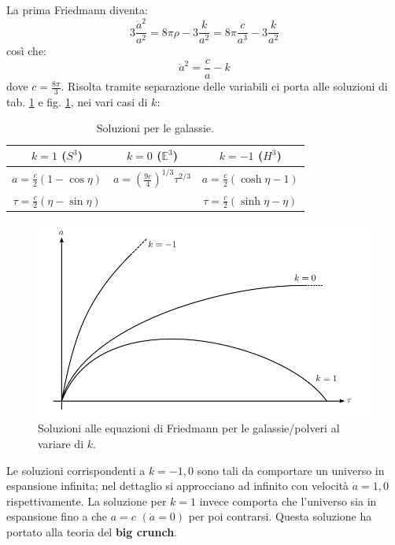 \begin{itemize}
    La prima Friedmann diventa:
    \begin{equation*}
        3\frac{\dot{a}^2}{a^2} = 8\pi \rho -3\frac{k}{a^2} = 8\pi \frac{c}{a^3}-3 \frac{k}{a^2}
    \end{equation*}
    così che:
    \begin{equation*}
        \dot{a}^2 = \frac{c}{a}-k
    \end{equation*}
    dove $c=\frac{8\pi}{3}$. Risolta tramite separazione delle variabili ci porta alle soluzioni di tab. \ref{tab.galassie} e fig. \ref{fig.soluzioni_galassie}, nei vari casi di $k$:
    \begin{table}
        \centering
        \begin{tabular}{ccc}
        $k=1$ ($S^3$) & $k=0$ ($\mathbb{E}^3$) & $k=-1$ ($H^3$) \\
        \hline
        $a= \frac{c}{2}(1-\cos \eta)$     &  $a=(\frac{9c}{4})^{1/3}\tau^{2/3}$ &  $a= \frac{c}{2}(\cosh\eta-1)$ \\
        $\tau = \frac{c}{2}(\eta -\sin \eta)$ &     & $\tau = \frac{c}{2}(\sinh\eta - \eta)$ \\
        \hline
        \end{tabular}
        \caption{Soluzioni per le galassie.}
        \label{tab.galassie}
    \end{table}
    \begin{figure}
        \centering
        \includegraphics[scale=0.5]{immagini/soluzioni_galassie.png}
        \caption{Soluzioni alle equazioni di Friedmann per le galassie/polveri al variare di $k$.}
        \label{fig.soluzioni_galassie}
    \end{figure}
Le soluzioni corrispondenti a $k=-1,0$ sono tali da comportare un universo in espansione infinita; nel dettaglio si approcciano ad infinito con velocità $\dot{a}= 1, 0$ rispettivamente. La soluzione per $k=1$ invece comporta che l'universo sia in espansione fino a che $a=c$ $(\dot{a}=0)$ per poi contrarsi. Questa soluzione ha portato alla teoria del \textbf{big crunch}.


\end{itemize}
